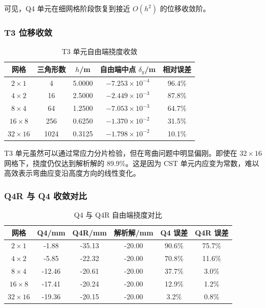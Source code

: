 \documentclass[UTF8,a4paper,zihao=-4]{ctexart}
\begin{document}
可见，Q4 单元在细网格阶段恢复到接近 $O(h^2)$ 的位移收敛阶。

\subsubsection{T3 位移收敛}

\begin{table}[H]
    \centering
    \caption{T3 单元自由端挠度收敛}
    \label{tab:t3_disp_conv}
    \begin{tabular}{ccccc}
        \toprule
        网格 & 三角形数 & $h$/m & 自由端中点 $\delta_y$/m & 相对误差\\
        \midrule
        $2\times1$ & 4 & 5.0000 & $-7.253\times10^{-4}$ & 96.4\%\\
        $4\times2$ & 16 & 2.5000 & $-2.449\times10^{-3}$ & 87.8\%\\
        $8\times4$ & 64 & 1.2500 & $-7.053\times10^{-3}$ & 64.7\%\\
        $16\times8$ & 256 & 0.6250 & $-1.370\times10^{-2}$ & 31.5\%\\
        $32\times16$ & 1024 & 0.3125 & $-1.798\times10^{-2}$ & 10.1\%\\
        \bottomrule
    \end{tabular}
\end{table}

T3 单元虽然可以通过常应力分片检验，但在弯曲问题中明显偏刚。即使在 $32\times16$ 网格下，挠度仍仅达到解析解的 89.9\%。这是因为 CST 单元内应变为常数，难以高效表示弯曲应变沿高度方向的线性变化。

\subsubsection{Q4R 与 Q4 收敛对比}

\begin{table}[H]
    \centering
    \caption{Q4 与 Q4R 自由端挠度对比}
    \label{tab:q4_q4r_compare}
    \begin{tabular}{cccccc}
        \toprule
        网格 & Q4/mm & Q4R/mm & 解析解/mm & Q4 误差 & Q4R 误差\\
        \midrule
        $2\times1$ & -1.88 & -35.13 & -20.00 & 90.6\% & 75.7\%\\
        $4\times2$ & -5.85 & -22.32 & -20.00 & 70.8\% & 11.6\%\\
        $8\times4$ & -12.46 & -20.61 & -20.00 & 37.7\% & 3.0\%\\
        $16\times8$ & -17.41 & -20.24 & -20.00 & 12.9\% & 1.2\%\\
        $32\times16$ & -19.36 & -20.15 & -20.00 & 3.2\% & 0.8\%\\
        \bottomrule
    \end{tabular}
\end{table}
\end{document}

